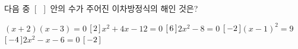 다음 중 $[\ \ ]$ 안의 수가 주어진 이차방정식의 해인 것은?
\begin{choicesv}{$(x+2)(x-3)=0$ \quad $[\mkern3mu 2\mkern3mu ]$}{$x^2+4x-12=0$ \quad $[\mkern3mu 6\mkern3mu ]$}{$2x^2-8=0$ \quad $[\mkern3mu -2\mkern3mu ]$}{$(x-1)^2=9$ \quad $[\mkern3mu -4\mkern3mu ]$}{$2x^2-x-6=0$ \quad $[\mkern3mu -2\mkern3mu ]$}\end{choicesv}
